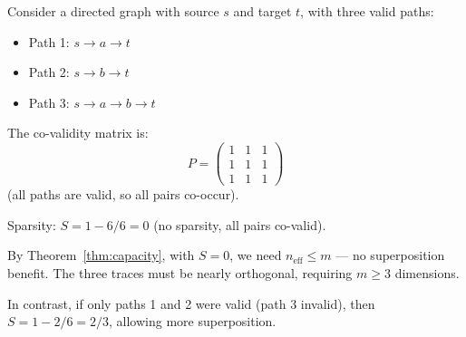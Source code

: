 \begin{example}
Consider a directed graph with source $s$ and target $t$, with three valid paths:
\begin{itemize}
    \item Path 1: $s \to a \to t$
    \item Path 2: $s \to b \to t$
    \item Path 3: $s \to a \to b \to t$
\end{itemize}

The co-validity matrix is:
\begin{equation}
P = \begin{pmatrix} 1 & 1 & 1 \\ 1 & 1 & 1 \\ 1 & 1 & 1 \end{pmatrix}
\end{equation}
(all paths are valid, so all pairs co-occur).

Sparsity: $S = 1 - 6/6 = 0$ (no sparsity, all pairs co-valid).

By Theorem~\ref{thm:capacity}, with $S = 0$, we need $n_{\text{eff}} \leq m$ --- no superposition benefit. The three traces must be nearly orthogonal, requiring $m \geq 3$ dimensions.

In contrast, if only paths 1 and 2 were valid (path 3 invalid), then $S = 1 - 2/6 = 2/3$, allowing more superposition.
\end{example}

